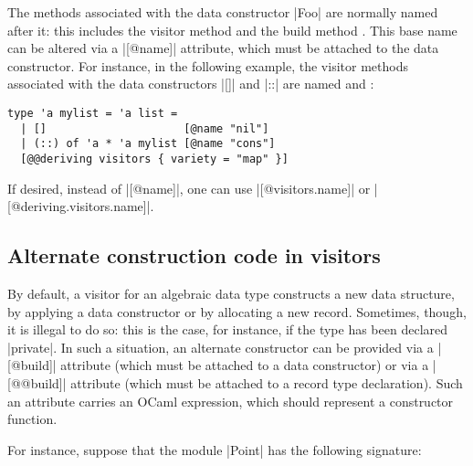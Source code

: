 \documentclass[11pt,a4paper,twoside]{article}
\begin{document}
The methods associated with the data constructor \oc|Foo| are normally named
after it: this includes the visitor method  and the build
method .
%
This base name can be altered via a \oc|[@name]| attribute, which must be
attached to the data constructor. For instance, in the following example,
the visitor methods associated with the data constructors \oc|[]| and \oc|::|
are named  and :
%
\begin{origenv}
\begin{lstlisting}
type 'a mylist = 'a list =
  | []                     [@name "nil"]
  | (::) of 'a * 'a mylist [@name "cons"]
  [@@deriving visitors { variety = "map" }]
\end{lstlisting}
\end{origenv}
%
If desired, instead of \oc|[@name]|, one can use
\oc|[@visitors.name]| or \oc|[@deriving.visitors.name]|.


\subsection{Alternate construction code in \map visitors}
\label{sec:build}

By default, a \map visitor for an algebraic data type constructs a new data
structure, by applying a data constructor or by allocating a new record.
Sometimes, though, it is illegal to do so: this is the case, for instance, if
the type has been declared \oc|private|.
%
%
%
In such a situation, an alternate constructor can be provided via a
\oc|[@build]| attribute (which must be attached to a data constructor) or via a
\oc|[@@build]| attribute (which must be attached to a record type declaration).
%
Such an attribute carries an OCaml expression, which should represent a
constructor function.

For instance, suppose that the module \oc|Point| has the following signature:
\begin{mdframed}[backgroundcolor=green!10]

\end{mdframed}
\end{document}
